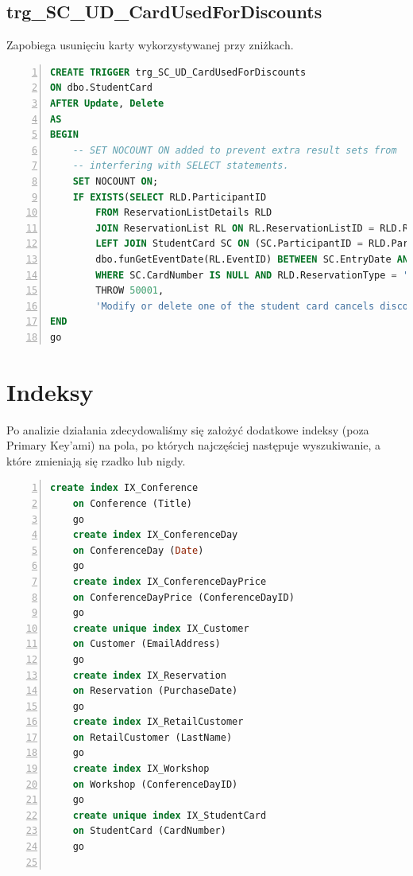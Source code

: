 \documentclass[]{article}
\begin{document}
	\subsection{trg\_SC\_UD\_CardUsedForDiscounts}
Zapobiega usunięciu karty wykorzystywanej przy zniżkach.
\begin{lstlisting}[language=SQL,
showspaces=false,
basicstyle=\ttfamily,
numbers=left,
numberstyle=\tiny,
tabsize=2,
backgroundcolor=\color{lightg},
keywordstyle=\color{lightblue},
commentstyle=\color{gray}]
CREATE TRIGGER trg_SC_UD_CardUsedForDiscounts
ON dbo.StudentCard
AFTER Update, Delete
AS 
BEGIN
	-- SET NOCOUNT ON added to prevent extra result sets from
	-- interfering with SELECT statements.
	SET NOCOUNT ON;
	IF EXISTS(SELECT RLD.ParticipantID
		FROM ReservationListDetails RLD
		JOIN ReservationList RL ON RL.ReservationListID = RLD.ReservationListID
		LEFT JOIN StudentCard SC ON (SC.ParticipantID = RLD.ParticipantID AND
		dbo.funGetEventDate(RL.EventID) BETWEEN SC.EntryDate AND SC.ExpiryDate)
		WHERE SC.CardNumber IS NULL AND RLD.ReservationType = 'Student')
		THROW 50001, 
		'Modify or delete one of the student card cancels discount.', 1
END
go
\end{lstlisting}

\section{Indeksy}
	Po analizie działania zdecydowaliśmy się założyć dodatkowe indeksy (poza Primary Key'ami) na pola, po których najczęściej następuje wyszukiwanie, a które zmieniają się rzadko lub nigdy.
	\begin{lstlisting}[language=SQL,
	showspaces=false,
	basicstyle=\ttfamily,
	numbers=left,
	numberstyle=\tiny,
	tabsize=2,
	backgroundcolor=\color{lightg},
	keywordstyle=\color{lightblue},
	commentstyle=\color{gray}]
	create index IX_Conference
	on Conference (Title)
	go
	create index IX_ConferenceDay
	on ConferenceDay (Date)
	go
	create index IX_ConferenceDayPrice
	on ConferenceDayPrice (ConferenceDayID)
	go
	create unique index IX_Customer
	on Customer (EmailAddress)
	go
	create index IX_Reservation
	on Reservation (PurchaseDate)
	go
	create index IX_RetailCustomer
	on RetailCustomer (LastName)
	go
	create index IX_Workshop
	on Workshop (ConferenceDayID)
	go
	create unique index IX_StudentCard
	on StudentCard (CardNumber)
	go
	
	\end{lstlisting}
\end{document}
